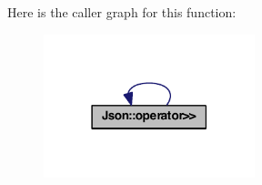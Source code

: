 Here is the caller graph for this function\-:
\nopagebreak
\begin{figure}[H]
\begin{center}
\leavevmode
\includegraphics[width=174pt]{namespace_json_a4d245ef719cc0853e8e78eb5f99c16e5_icgraph}
\end{center}
\end{figure}


